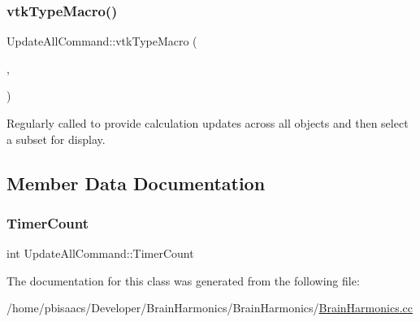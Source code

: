 \mbox{\label{classUpdateAllCommand_a228565b2a2306d425dc7eb3cda4d39a4}} 
\subsubsection{\texorpdfstring{vtk\+Type\+Macro()}{vtkTypeMacro()}}
{\footnotesize\ttfamily Update\+All\+Command\+::vtk\+Type\+Macro (\begin{DoxyParamCaption}\item[{\mbox{\hyperlink{classUpdateAllCommand}{Update\+All\+Command}}}]{,  }\item[{vtk\+Command}]{ }\end{DoxyParamCaption})}

Regularly called to provide calculation updates across all objects and then select a subset for display. 

\subsection{Member Data Documentation}
\mbox{\label{classUpdateAllCommand_a66ba9400072105306ca48a58470014dc}} 
\subsubsection{\texorpdfstring{Timer\+Count}{TimerCount}}
{\footnotesize\ttfamily int Update\+All\+Command\+::\+Timer\+Count\hspace{0.3cm}{\ttfamily [private]}}



The documentation for this class was generated from the following file\+:\begin{DoxyCompactItemize}
\item 
/home/pbisaacs/\+Developer/\+Brain\+Harmonics/\+Brain\+Harmonics/\mbox{\hyperlink{BrainHarmonics_8cc}{Brain\+Harmonics.\+cc}}\end{DoxyCompactItemize}
